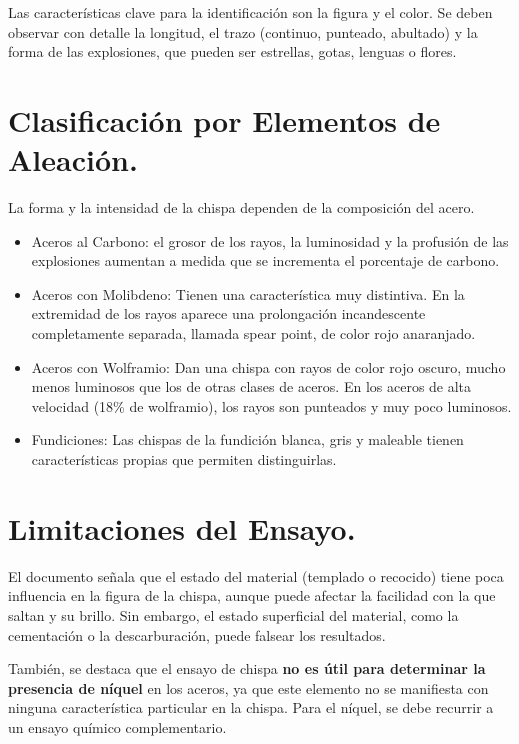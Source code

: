\documentclass[12pt,a4paper]{article}
\begin{document}
Las características clave para la identificación son la figura y el color. Se deben observar con detalle la longitud, el trazo (continuo, punteado, abultado) y la forma de las explosiones, que pueden ser estrellas, gotas, lenguas o flores.

\section{Clasificación por Elementos de Aleación.}

La forma y la intensidad de la chispa dependen de la composición del acero.
\begin{itemize}
    \item Aceros al Carbono: el grosor de los rayos, la luminosidad y la profusión de las explosiones aumentan a medida que se incrementa el porcentaje de carbono.
    \item Aceros con Molibdeno: Tienen una característica muy distintiva. En la extremidad de los rayos aparece una prolongación incandescente completamente separada, llamada \textacutedbl{}spear point\textacutedbl{}, de color rojo anaranjado.
    \item Aceros con Wolframio: Dan una chispa con rayos de color rojo oscuro, mucho menos luminosos que los de otras clases de aceros. En los aceros de alta velocidad (18\% de wolframio), los rayos son punteados y muy poco luminosos.
    \item Fundiciones: Las chispas de la fundición blanca, gris y maleable tienen características propias que permiten distinguirlas.
\end{itemize}

\section{Limitaciones del Ensayo.}

El documento señala que el estado del material (templado o recocido) tiene poca influencia en la figura de la chispa, aunque puede afectar la facilidad con la que saltan y su brillo. Sin embargo, el estado superficial del material, como la cementación o la descarburación, puede falsear los resultados.


También, se destaca que el ensayo de chispa \textbf{no es útil para determinar la presencia de níquel} en los aceros, ya que este elemento no se manifiesta con ninguna característica particular en la chispa. Para el níquel, se debe recurrir a un ensayo químico complementario.
\end{document}
